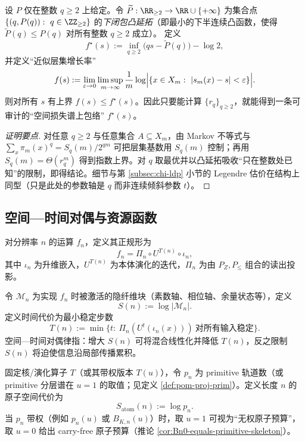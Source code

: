 \begin{proposition}\label{prop:pom-fold-multifractal-envelope}
设 $P$ 仅在整数 $q\ge 2$ 上给定。令 $\widetilde P:\RR_{\ge 2}\to\RR\cup\{+\infty\}$ 为集合点 $\{(q,P(q)):\ q\in\ZZ_{\ge 2}\}$ 的\emph{下闭包凸延拓}（即最小的下半连续凸函数，使得 $\widetilde P(q)\le P(q)$ 对所有整数 $q\ge2$ 成立）。
定义
\[
f^\star(s):=\inf_{q\ge 2}\bigl(qs-\widetilde P(q)\bigr)-\log 2,
\]
并定义“近似层集增长率”
\[
f(s):=\lim_{\varepsilon\to 0}\limsup_{m\to\infty}\frac{1}{m}\log\Bigl|\{x\in X_m:\ |s_m(x)-s|<\varepsilon\}\Bigr|.
\]
则对所有 $s$ 有上界 $f(s)\le f^\star(s)$。因此只要能计算 $\{r_q\}_{q\ge 2}$，就能得到一条可审计的“空间损失谱上包络” $f^\star(s)$。
\end{proposition}
\begin{proof}[证明要点]
对任意 $q\ge 2$ 与任意集合 $A\subseteq X_m$，由 Markov 不等式与
\(
\sum_x \pi_m(x)^q=S_q(m)/2^{qm}
\)
可把层集基数用 $S_q(m)$ 控制；再用 $S_q(m)=\Theta(r_q^m)$ 得到指数上界。对 $q$ 取最优并以凸延拓吸收“只在整数处已知”的限制，即得结论。细节与第 \ref{subsec:chi-ldp} 小节的 Legendre 估价在结构上同型（只是此处的参数轴是 $q$ 而非连续倾斜参数 $t$）。
\end{proof}

\subsection{空间—时间对偶与资源函数}\label{subsec:pom-resources}
\begin{definition}[嵌入—演化—投影正规形]\label{def:pom-normal-form}
对分辨率 $n$ 的运算 $f_n$，定义其正规形为
\[
f_n=\Pi_n\circ U^{T(n)}\circ \iota_n,
\]
其中 $\iota_n$ 为升维嵌入，$U^{T(n)}$ 为本体演化的迭代，$\Pi_n$ 为由 $P_Z,P_{\le}$ 组合的读出投影。
\end{definition}

\begin{definition}[空间代价与时间代价]\label{def:pom-space-time}
令 $\mathcal M_n$ 为实现 $f_n$ 时被激活的隐纤维块（素数轴、相位轴、余量状态等），定义
\[
S(n):=\log|\mathcal M_n|.
\]
定义时间代价为最小稳定步数
\[
T(n):=\min\{t:\ \Pi_n(U^t(\iota_n(x)))\ \text{对所有输入稳定}\}.
\]
空间—时间对偶律指：增大 $S(n)$ 可将混合线性化并降低 $T(n)$，反之限制 $S(n)$ 将迫使信息沿局部传播累积。
\end{definition}

\begin{definition}\label{def:pom-atom-space-cost}
固定核/演化算子 $T$（或其带权版本 $T(u)$），令 $p_n$ 为 primitive 轨道数（或 primitive 分层谱在 $u=1$ 的取值；见定义 \ref{def:pom-proj-prim}）。定义长度 $n$ 的原子空间代价为
$$
S_{\mathrm{atom}}(n):=\log p_n.
$$
当 $p_n$ 带权（例如 $p_n(u)$ 或 $B_{K,n}(u)$）时，取 $u=1$ 可视为“无权原子预算”，取 $u=0$ 给出 carry-free 原子预算（推论 \ref{cor:Bn0-equals-primitive-skeleton}）。
\end{definition}

